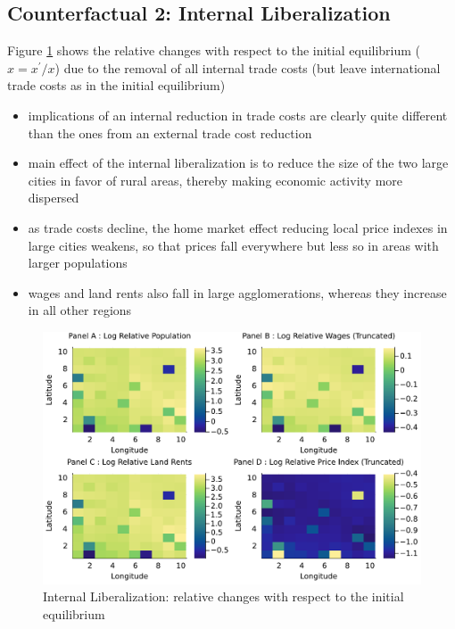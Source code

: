 \documentclass[11pt]{article}
\begin{document}
\subsection*{Counterfactual 2: Internal Liberalization}
Figure \ref{counter_2} shows the relative changes with respect to the initial equilibrium ($\hat{x} = x^{'}/x$) due to the removal of all internal trade costs (but leave international trade costs as in the initial equilibrium)
\begin{itemize}
\item implications of an internal reduction in trade costs are clearly quite different than the ones from an external trade cost reduction
\item  main effect of the internal liberalization is to reduce the size of the two large cities in favor of rural areas, thereby making economic activity more dispersed
\item as trade costs decline, the home market effect reducing local price indexes in large cities weakens, so that prices fall everywhere but less so in areas with larger populations
\item wages and land rents also fall in large agglomerations, whereas they increase in all other regions
\end{itemize}

\begin{figure}[H]
\caption{Internal Liberalization: relative changes with respect to the initial equilibrium}
\centering
\label{counter_2}
\includegraphics[scale=0.8]{../graph/H_cnty_cc.pdf}
\end{figure}
\end{document}
